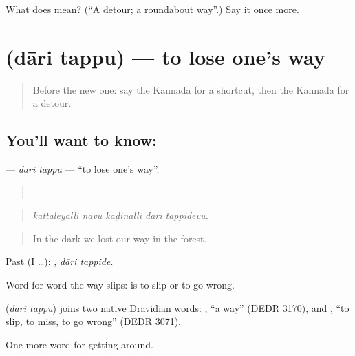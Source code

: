 \begin{tcolorbox}[breakable,colback=teal!4,colframe=teal!35!black,title={Before you move on}]
What does  mean? (\textquotedblleft{}A detour; a roundabout way\textquotedblright{}.) Say it once more.
\end{tcolorbox}
\section[\texorpdfstring{\kn{ದಾರಿ} \kn{ತಪ್ಪು} (dāri tappu)}{ದಾರಿ ತಪ್ಪು (dāri tappu)}]{  (dāri tappu) — to lose one's way}

\label{lesson:KA-C446-dari-tappu}



\begin{quote}
Before the new one: say the Kannada for a shortcut, then the Kannada for a detour.
\end{quote}

\subsection*{You'll want to know:  }
\textbf{ } — \emph{dāri tappu} — \textquotedblleft{}to lose one's way\textquotedblright{}.

\begin{quote}
    .
\end{quote}

\begin{quote}
\emph{kattaleyalli nāvu kāḍinalli dāri tappidevu.}
\end{quote}

\begin{quote}
In the dark we lost our way in the forest.
\end{quote}

Past (I …):  , \emph{dāri tappide}.

Word for word the way slips:  is to slip or to go wrong.

\begin{cousinweb}
\textbf{ } (\emph{dāri tappu}) joins two native Dravidian words: , \textquotedblleft{}a way\textquotedblright{} (DEDR 3170), and , \textquotedblleft{}to slip, to miss, to go wrong\textquotedblright{} (DEDR 3071).
\end{cousinweb}

\begin{grammarlens}[title={What you've built}]
One more word for getting around.
\end{grammarlens}

